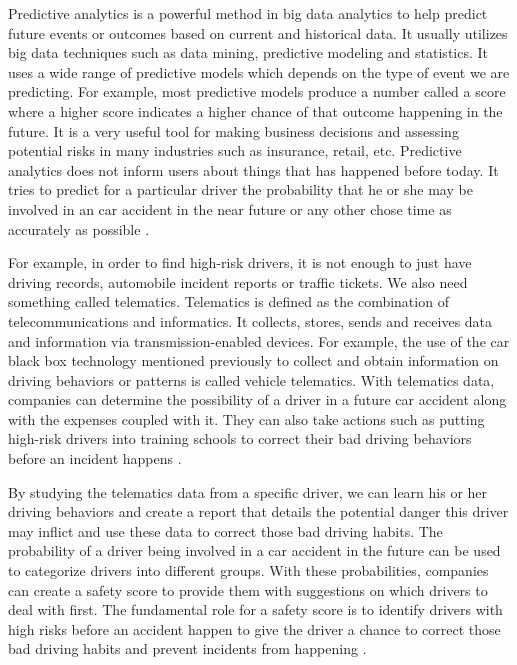 Predictive analytics is a powerful method in big data analytics to help predict future events or outcomes based on current and historical data. It usually utilizes big data techniques such as data mining, predictive modeling and statistics. It uses a wide range of predictive models which depends on the type of event we are predicting. For example, most predictive models produce a number called a score where a higher score indicates a higher chance of that outcome happening in the future. It is a very useful tool for making business decisions and assessing potential risks in many industries such as insurance, retail, etc. Predictive analytics does not inform users about things that has happened before today. It tries to predict for a particular driver the probability that he or she may be involved in an car accident in the near future or any other chose time as accurately as possible \cite{Suizo2015decisions}.

For example, in order to find high-risk drivers, it is not enough to just have driving records, automobile incident reports or traffic tickets. We also need something called telematics. Telematics is defined as the combination of telecommunications and informatics. It collects, stores, sends and receives data and information via transmission-enabled devices. For example, the use of the car black box technology mentioned previously to collect and obtain information on driving behaviors or patterns is called vehicle telematics. With telematics data, companies can determine the possibility of a driver in a future car accident along with the expenses coupled with it. They can also take actions such as putting high-risk drivers into training schools to correct their bad driving behaviors before an incident happens \cite{Suizo2015decisions}.

By studying the telematics data from a specific driver, we can learn his or her driving behaviors and create a report that details the potential danger this driver may inflict and use these data to correct those bad driving habits. The probability of a driver being involved in a car accident in the future can be used to categorize drivers into different groups. With these probabilities, companies can create a safety score to provide them with suggestions on which drivers to deal with first. The fundamental role for a safety score is to identify drivers with high risks before an accident happen to give the driver a chance to correct those bad driving habits and prevent incidents from happening \cite{Suizo2015decisions}.

